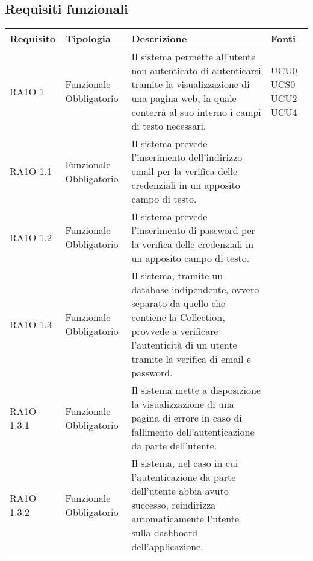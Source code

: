 \subsection{Requisiti funzionali }

      \begin{center}
      \bgroup
      \def\arraystretch{1.8}
      \begin{longtable}{ | l | p{2cm} | p{5cm} | p{1.7cm} |}
    
      \cellcolor[gray]{0.9} \textbf{Requisito} & \cellcolor[gray]{0.9} \textbf{Tipologia} 
      & \cellcolor[gray]{0.9} \textbf{Descrizione} & \cellcolor[gray]{0.9} \textbf{Fonti} \\ \hline
      
        RA1O 1 & Funzionale \newline  Obbligatorio  & Il sistema permette all'utente non autenticato di autenticarsi tramite la visualizzazione di una pagina web, la quale conterrà al suo interno i campi di testo necessari.  &  UCU0 \newline  UCS0 \newline  UCU2 \newline  UCU4 \newline  \\ \hline      
        RA1O 1.1 & Funzionale \newline  Obbligatorio  & Il sistema prevede l'inserimento dell'indirizzo email per la verifica delle credenziali in un apposito campo di testo. &  \\ \hline      
        RA1O 1.2 & Funzionale \newline  Obbligatorio  & Il sistema prevede l'inserimento di password per la verifica delle credenziali in un apposito campo di testo. &  \\ \hline      
        RA1O 1.3 & Funzionale \newline  Obbligatorio  & Il sistema, tramite un database indipendente, ovvero separato da quello che contiene la Collection, provvede a verificare l'autenticità  di un utente tramite la verifica di email e password. &  \\ \hline      
        RA1O 1.3.1 & Funzionale \newline  Obbligatorio  & Il sistema mette a disposizione la visualizzazione di una pagina di errore in caso di fallimento dell'autenticazione da parte dell'utente. &  \\ \hline      
        RA1O 1.3.2 & Funzionale \newline  Obbligatorio  & Il sistema, nel caso in cui l'autenticazione da parte dell'utente abbia avuto successo, reindirizza automaticamente l'utente sulla dashboard dell'applicazione. &  \\ \hline      

\end{longtable}
\end{center}
